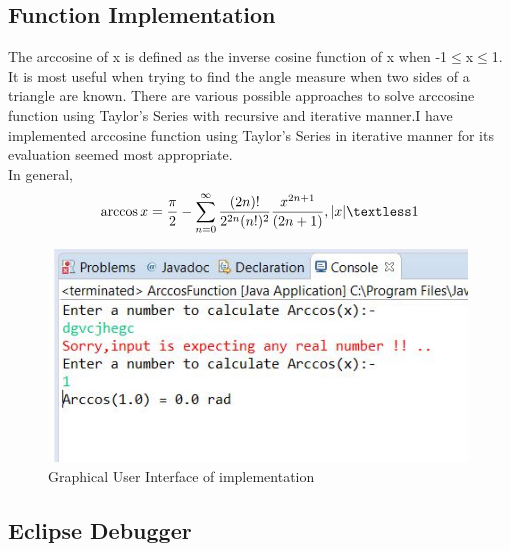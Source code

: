 \documentclass[a4paper,11pt]{report}
\begin{document}
\subsection{Function Implementation}
The arccosine of x is defined as the inverse cosine function of x when -1$\leq$x$\leq$1.
It is most useful when trying to find the angle measure when two sides of a triangle are known.
There are various possible approaches to solve arccosine function using Taylor's
Series with recursive and iterative manner.I have implemented arccosine function using Taylor's
Series in iterative manner for its evaluation seemed most appropriate.\\
In general,
\begin{equation}
    \arccos x = \frac{\pi}{2}-\sum_{n=0}^\infty\frac{(2n)!}{2^{2n}(n!)^{2}}\frac{x^{2n+1}}{(2n+1)},|x|\textless1\\
\end{equation}


\begin{figure}[h]
    \centering
    \includegraphics[width=0.99\textwidth]{guii.JPG}
    \caption{Graphical User Interface of implementation}
    \label{fig:guii}
\end{figure}

\newpage
\subsection{Eclipse Debugger}
\end{document}
